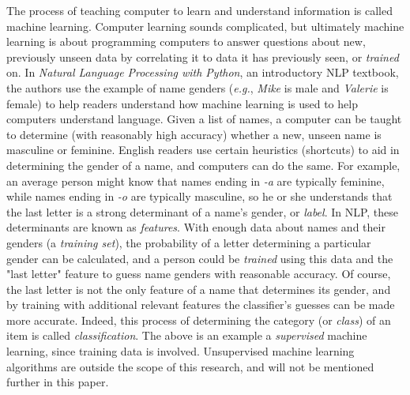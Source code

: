 The process of teaching computer to learn and understand information is called machine learning.
Computer learning sounds complicated, but ultimately machine learning is about programming computers to answer questions about new, previously unseen data by correlating it to data it has previously seen, or {\it trained} on.
In {\it Natural Language Processing with Python}, an introductory NLP textbook, the authors use the example of name genders ({\it e.g.}, {\it Mike} is male and {\it Valerie} is female) to help readers understand how machine learning is used to help computers understand language\cite{nlpwp}.
Given a list of names, a computer can be taught to determine (with reasonably high accuracy) whether a new, unseen name is masculine or feminine.
English readers use certain heuristics (shortcuts) to aid in determining the gender of a name, and computers can do the same.
For example, an average person might know that names ending in {\it -a} are typically feminine, while names ending in {\it -o} are typically masculine, so he or she understands that the last letter is a strong determinant of a name's gender, or {\it label}.
In NLP, these determinants are known as {\it features}.
With enough data about names and their genders (a {\it training set}), the probability of a letter determining a particular gender can be calculated, and a person could be {\it trained} using this data and the "last letter" feature to guess name genders with reasonable accuracy.
Of course, the last letter is not the only feature of a name that determines its gender, and by training with additional relevant features the classifier's guesses can be made more accurate.
Indeed, this process of determining the category (or {\it class}) of an item is called {\it classification}.
The above is an example a {\it supervised} machine learning, since training data is involved.
Unsupervised machine learning algorithms are outside the scope of this research, and will not be mentioned further in this paper.

